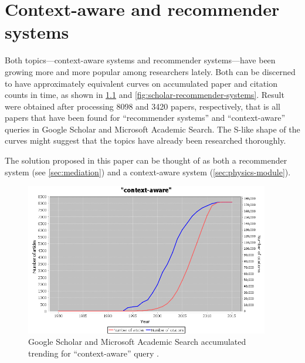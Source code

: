 \chapter{Context-aware and recommender systems}
\label{cha:recommenders}

Both topics---context-aware systems and recommender systems---have been growing more and more popular among researchers lately. Both can be discerned to have approximately equivalent curves on accumulated paper and citation counts in time, as shown in \cref{fig:scholar-context-aware} and \cref{fig:scholar-recommender-systems}. Result were obtained after processing 8098 and 3420 papers, respectively, that is all papers that have been found for ``recommender systems'' and ``context-aware'' queries in Google Scholar and Microsoft Academic Search. The S-like shape of the curves might suggest that the topics have already been researched thoroughly.

The solution proposed in this paper can be thought of as both a recommender system (see \cref{sec:mediation}) and a context-aware system (\cref{sec:physics-module}).

\begin{figure}
	\centering
	\includegraphics[width=0.95\textwidth]{scholar-context-aware}
	\caption{Google Scholar and Microsoft Academic Search accumulated trending for ``context-aware'' query \cite{Rus:scholar-trends}.}
	\label{fig:scholar-context-aware}
\end{figure}

